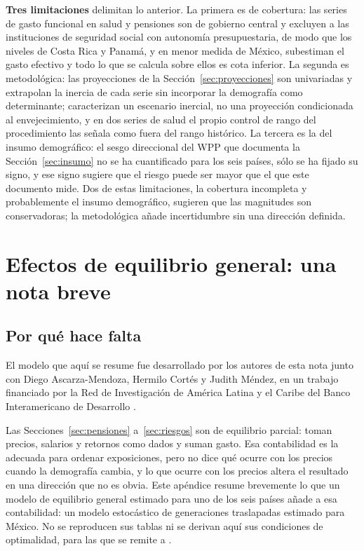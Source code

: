 \documentclass[12pt, letterpaper]{article}
\begin{document}
\textbf{Tres limitaciones} delimitan lo anterior. La primera es de
cobertura: las series de gasto funcional en salud y pensiones son de gobierno
central y excluyen a las instituciones de seguridad social con autonomía
presupuestaria, de modo que los niveles de Costa Rica y Panamá, y en menor medida
de México, subestiman el gasto efectivo y todo lo que se calcula sobre ellos es
cota inferior. La segunda es metodológica: las proyecciones de la
Sección~\ref{sec:proyecciones} son univariadas y extrapolan la inercia de cada
serie sin incorporar la demografía como determinante; caracterizan un escenario
inercial, no una proyección condicionada al envejecimiento, y en dos series de
salud el propio control de rango del procedimiento las señala como fuera del rango
histórico. La tercera es la del insumo demográfico: el sesgo direccional del WPP
que documenta la Sección~\ref{sec:insumo} no se ha cuantificado para los seis
países, sólo se ha fijado su signo, y ese signo sugiere que el riesgo puede ser
mayor que el que este documento mide. Dos de estas limitaciones, la cobertura
incompleta y probablemente el insumo demográfico, sugieren que las magnitudes son
conservadoras; la metodológica añade incertidumbre sin una dirección definida.

\newpage
\appendix
\section{Efectos de equilibrio general: una nota breve}
\label{ap:eg}

\subsection{Por qué hace falta}

El modelo que aquí se resume fue desarrollado por los autores de esta nota junto
con Diego Ascarza-Mendoza, Hermilo Cortés y Judith Méndez, en un trabajo financiado
por la Red de Investigación de América Latina y el Caribe del Banco Interamericano
de Desarrollo \citep{ascarza2026}.

Las Secciones~\ref{sec:pensiones} a~\ref{sec:riesgos} son de equilibrio parcial:
toman precios, salarios y retornos como dados y suman gasto. Esa contabilidad es la
adecuada para ordenar exposiciones, pero no dice qué ocurre con los precios cuando
la demografía cambia, y lo que ocurre con los precios altera el resultado en una
dirección que no es obvia. Este apéndice resume brevemente lo que un modelo de equilibrio general estimado para uno de los seis países añade a
esa contabilidad: un modelo estocástico de generaciones traslapadas estimado para
México. No se reproducen sus tablas ni se derivan aquí sus condiciones de
optimalidad, para las que se remite a \citet{ascarza2026}.
\end{document}
